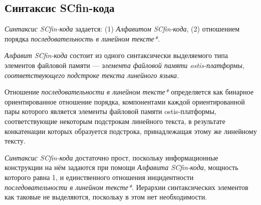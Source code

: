 \subsection{Синтаксис SCfin-кода}
\label{sec_soft_platform_scfin_code_alphabet_and_syntax}

\textit{Синтаксис SCfin-кода} задается: (1) \textit{Алфавитом SCfin-кода}, (2) отношением порядка \textit{последовательность в линейном тексте*}.

\begin{SCn}
\begin{scneqtoset}
\end{scneqtoset}
\end{SCn}

\textit{Алфавит SCfin-кода\scnsupergroupsign} состоит из одного синтаксически выделяемого типа элементов файловой памяти --- \textit{элемента файловой памяти ostis-платформы, соответствующего подстроке текста линейного языка}.

\begin{SCn}
\end{SCn}

Отношение \textit{последовательности в линейном тексте*} определяется как бинарное ориентированное отношение порядка, компонентами каждой ориентированной пары которого является элементы файловой памяти ostis-платформы, соответствующие некоторым подстрокам линейного текста, в результате конкатенации которых образуется подстрока, принадлежащая этому же линейному тексту.

\textit{Синтаксис SCfin-кода} достаточно прост, поскольку информационные конструкции на нём задаются при помощи \textit{Алфавита SCfin-кода}, мощность которого равна 1, и единственного отношения инцидентности \textit{последовательности в линейном тексте*}. Иерархии синтаксических элементов как таковые не выделяются, поскольку в этом нет необходимости.

